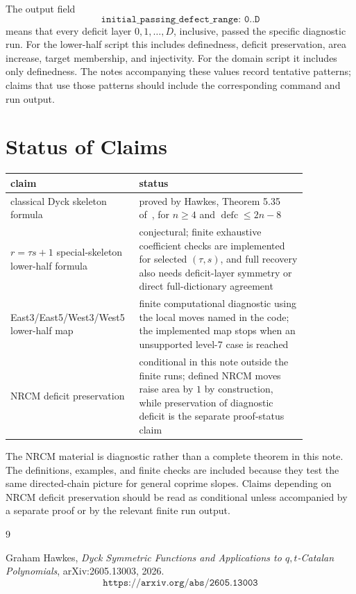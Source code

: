 \documentclass{article}
\newcommand{\defc}{\operatorname{defc}}
\begin{document}
The output field
\[
  \texttt{initial\_passing\_defect\_range: 0..D}
\]
means that every deficit layer \(0,1,\ldots,D\), inclusive, passed the specific
diagnostic run.  For the lower-half script this includes definedness, deficit
preservation, area increase, target membership, and injectivity.  For the
domain script it includes only definedness.  The notes accompanying these
values record tentative patterns; claims that use those patterns should include
the corresponding command and run output.

\section{Status of Claims}

\begin{center}
\begin{tabular}{p{0.31\linewidth}|p{0.54\linewidth}}
claim & status\\
\hline
classical Dyck skeleton formula &
proved by Hawkes, Theorem 5.35 of~\cite{Hawkes2026DyckSymmetric}, for
\(n\ge4\) and \(\defc\le 2n-8\)\\
\(r=\tau s+1\) special-skeleton lower-half formula &
conjectural; finite exhaustive coefficient checks are implemented for selected
\((\tau,s)\), and full recovery also needs deficit-layer symmetry or direct
full-dictionary agreement\\
East3/East5/West3/West5 lower-half map &
finite computational diagnostic using the local moves named in the code; the
implemented map stops when an unsupported level-7 case is reached\\
NRCM deficit preservation &
conditional in this note outside the finite runs; defined NRCM moves raise area
by \(1\) by construction, while preservation of diagnostic deficit is the
separate proof-status claim
\end{tabular}
\end{center}

The NRCM material is diagnostic rather than a complete theorem in this note.
The definitions, examples, and finite checks are included because they test the
same directed-chain picture for general coprime slopes.  Claims depending on
NRCM deficit preservation should be read as conditional unless accompanied by a
separate proof or by the relevant finite run output.

\begin{thebibliography}{9}

Graham Hawkes,
\emph{Dyck Symmetric Functions and Applications to \(q,t\)-Catalan
Polynomials},
arXiv:2605.13003, 2026.
\[
  \texttt{https://arxiv.org/abs/2605.13003}
\]

\end{thebibliography}
\end{document}
